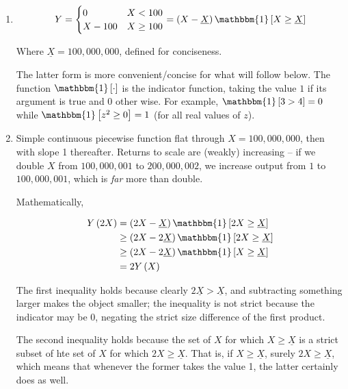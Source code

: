 \documentclass{article}
\newenvironment{solution}{\color{red}}{\color{black}}
\begin{document}
\begin{solution}

\begin{enumerate}
\item \[
Y=\begin{cases}
0 & X<100\\
X-100 & X\geq100
\end{cases}=\left(X-\underline{X}\right)\mathbbm{1}\left[X\geq\underline{X}\right]
\]

Where $\underline{X} = 100,000,000$, defined for conciseness.

The latter form is more convenient/concise for what will follow below. The function $\mathbbm{1}\left[\cdot\right]$ is the indicator function, taking the value $1$ if its argument is true and 0 other wise. For example, $\mathbbm{1}\left[3 > 4\right]=0$ while $\mathbbm{1}\left[z^2 \geq 0\right]=1$ (for all real values of $z$).

\item Simple continuous piecewise function flat through $X = 100,000,000$, then with slope 1 thereafter. Returns to scale are (weakly) increasing -- if we double $X$ from $100,000,001$ to $200,000,002$, we increase output from $1$ to $100,000,001$, which is \textit{far} more than double.

Mathematically,

\begin{align*}
Y\left(2X \right) &= \left(2X - \underline{X}\right) \mathbbm{1}\left[ 2X \geq \underline{X} \right] \\
 &\geq \left(2X - 2\underline{X}\right) \mathbbm{1}\left[ 2X \geq \underline{X} \right] \\
 &\geq \left(2X - 2\underline{X}\right) \mathbbm{1}\left[ X \geq \underline{X} \right] \\
 &= 2Y\left(X\right)
\end{align*}

The first inequality holds because clearly $2 \underline{X} > \underline{X}$, and subtracting something larger makes the object smaller; the inequality is not strict because the indicator may be 0, negating the strict size difference of the first product.

The second inequality holds because the set of $X$ for which $X \geq \underline{X}$ is a strict subset of hte set of $X$ for which $2X \geq \underline{X}$. That is, if $X \geq \underline{X}$, surely $2X \geq \underline{X}$, which means that whenever the former takes the value 1, the latter certainly does as well.


\end{enumerate}
\end{solution}
\end{document}
